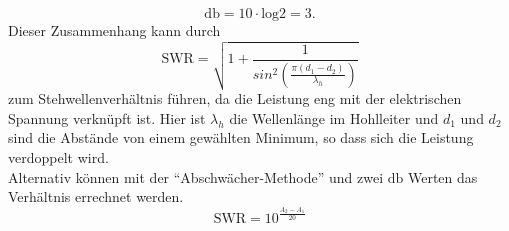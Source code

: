 \begin{equation*}
    \si{\decibel} = 10 \cdot \text{log} 2 = 3.
\end{equation*}
Dieser Zusammenhang kann durch 
\begin{equation}
    \text{SWR} =\sqrt{1 + \frac{1}{ sin^2 \left( \frac{\pi (d_1 - d_2)}{\lambda_h}  \right)} } 
\end{equation}
zum Stehwellenverhältnis führen, da die Leistung eng mit der elektrischen Spannung verknüpft ist. 
Hier ist $\lambda_h$ die Wellenlänge im Hohlleiter und $d_1$ und $d_2$ sind die Abstände von einem gewählten Minimum, so dass sich die Leistung verdoppelt wird. \\
Alternativ können mit der \enquote{Abschwächer-Methode} und zwei $\si{\decibel}$ Werten das Verhältnis errechnet werden.
\begin{equation}
    \text{SWR} = 10^{\frac{A_2-A_1}{20}}
\end{equation}
